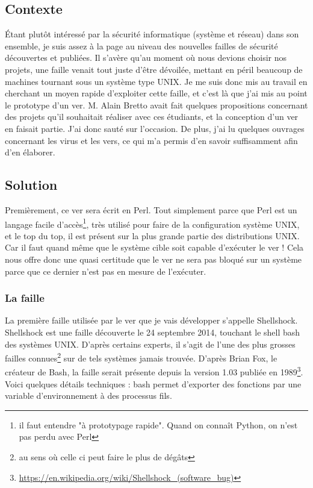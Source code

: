 \documentclass[]{projet-M1}
\begin{document}
\subsection{Contexte}
Étant plutôt intéressé par la sécurité informatique (système et réseau) dans son ensemble, je suis assez à la page au niveau des nouvelles \glspl{faille} de sécurité découvertes et publiées. Il s'avère qu'au moment où nous devions choisir nos projets, une \gls{faille} venait tout juste d’être dévoilée, mettant en péril beaucoup de machines tournant sous un système type \gls{UNIX}. Je me suis donc mis au travail en cherchant un moyen rapide d'exploiter cette \gls{faille}, et c'est là que j'ai mis au point le prototype d'un ver. M. Alain Bretto avait fait quelques propositions concernant des projets qu'il souhaitait réaliser avec ces étudiants, et la conception d'un ver en faisait partie. J'ai donc sauté sur l'occasion.
De plus, j'ai lu quelques ouvrages \cite{virus:filiol} concernant les virus et les vers, ce qui m'a permis d'en savoir suffisamment afin d'en élaborer. 

\subsection{Solution}
Premièrement, ce ver sera écrit en Perl. Tout simplement parce que Perl est un langage facile d'accès\footnote{il faut entendre "à prototypage rapide". Quand on connaît Python, on n'est pas perdu avec Perl}, très utilisé pour faire de la configuration système \gls{UNIX}, et le top du top, il est présent sur la plus grande partie des distributions \gls{UNIX}. Car il faut quand même que le système cible soit capable d'exécuter le ver ! Cela nous offre donc une quasi certitude que le ver ne sera pas bloqué sur un système parce que ce dernier n'est pas en mesure de l'exécuter.
\subsubsection{La faille}
La première \gls{faille} utilisée par le ver que je vais développer s'appelle \Gls{Shellshock}. \gls{Shellshock} est une \gls{faille} découverte le 24 septembre 2014, touchant le \gls{shell} \gls{bash} des systèmes \gls{UNIX}. D'après certains experts, il s'agit de l'une des plus grosses \glspl{faille} connues\footnote{au sens où celle ci peut faire le plus de dégâts} sur de tels systèmes jamais trouvée. D'après Brian Fox, le créateur de Bash, la faille serait présente depuis la version 1.03 publiée en 1989\footnote{\url{https://en.wikipedia.org/wiki/Shellshock_(software_bug)}}.
Voici quelques détails techniques : \gls{bash} permet d'exporter des fonctions par une variable d'environnement à des processus fils. 
\end{document}
